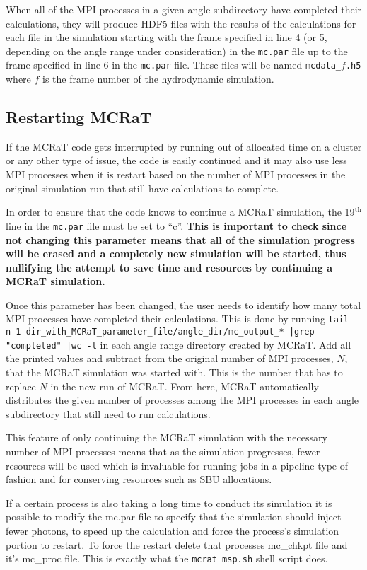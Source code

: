 \documentclass[12pt,a4paper]{article}
\begin{document}
 When all of the MPI processes in a given angle subdirectory have completed their calculations, they will produce HDF5 files with the results of the calculations for each file in the simulation starting with the frame specified in line 4 (or 5, depending on the angle range under consideration) in the \texttt{mc.par} file up to the frame specified in line 6 in the \texttt{mc.par} file. These files will be named \texttt{mcdata\_$f$.h5} where $f$ is the frame number of the hydrodynamic simulation.
 
 \subsection{Restarting MCRaT}
 If the MCRaT code gets interrupted by running out of allocated time on a cluster or any other type of issue, the code is easily continued and it may also use less MPI processes when it is restart based on the number of MPI processes in the original simulation run that still have calculations to complete. 
 
 In order to ensure that the code knows to continue a MCRaT simulation, the 19$^\textrm{th}$ line in the \texttt{mc.par} file must be set to ``c''. {\bf This is important to check since not changing this parameter means that all of the simulation progress will be erased and a completely new simulation will be started, thus nullifying the attempt to save time and resources by continuing a MCRaT simulation.} 
 
 Once this parameter has been changed, the user needs to identify how many total MPI processes have completed their calculations. This is done by running \texttt{tail -n 1 dir\_with\_MCRaT\_parameter\_file/angle\_dir/mc\_output\_* |grep "completed" |wc -l} in each angle range directory created by MCRaT. Add all the printed values and subtract from the original number of MPI processes, $N$, that the MCRaT simulation was started with. This is the number that has to replace $N$ in the new run of MCRaT. From here, MCRaT automatically distributes the given number of processes among the MPI processes in each angle subdirectory that still need to run calculations.
 
 This feature of only continuing the MCRaT simulation with the necessary number of MPI processes means that as the simulation progresses, fewer resources will be used which is invaluable for running jobs in a pipeline type of fashion and for conserving resources such as SBU allocations.
 
 If a certain process is also taking a long time to conduct its simulation it is possible to modify the mc.par file to specify that the simulation should inject fewer photons, to speed up the calculation and force the process's simulation portion to restart. To force the restart delete that processes mc\_chkpt file and it's  mc\_proc file. This is exactly what the \texttt{mcrat\_msp.sh} shell script does. 
 
\end{document}
